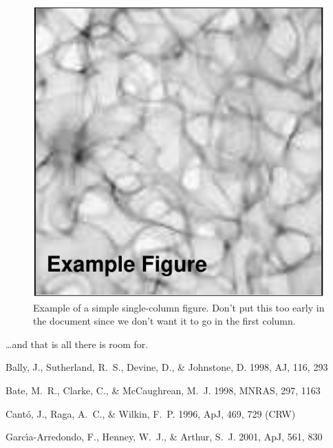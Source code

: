 \documentclass[preprint,proceedings]{rmaa}
\begin{document}
\begin{figure}[!t]
  \includegraphics[width=\columnwidth]{example-fig}
  \caption{Example of a simple single-column figure. Don't put this
    too early in the document since we don't want it to go in the
    first column.}
  \label{fig:simple}
\end{figure}

\dots and that is all there is room for.

\begin{thebibliography}

 Bally, J., Sutherland, R.~S., Devine, D., \&
  Johnstone, D. 1998, AJ, 116, 293

 Bate, M.~R., Clarke, C., \& McCaughrean, M.~J. 1998,
  MNRAS, 297, 1163

 Cant\'o, J., Raga, A.~C., \& Wilkin, F.~P. 1996, ApJ,
  469, 729 (CRW)

 Garc\'\i a-Arredondo, F., Henney, W.~J., \& Arthur,
  S.~J. 2001, ApJ, 561, 830 
  
\end{thebibliography}
\end{document}
